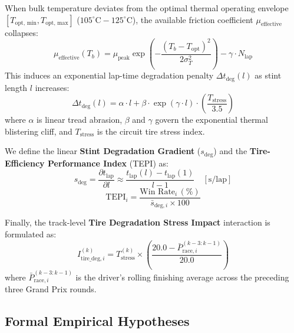 \documentclass[journal]{IEEEtran}
\begin{document}
When bulk temperature deviates from the optimal thermal operating envelope $[T_{\text{opt, min}}, T_{\text{opt, max}}]$ ($105^\circ\text{C} - 125^\circ\text{C}$), the available friction coefficient $\mu_{\text{effective}}$ collapses:
\begin{equation}
\mu_{\text{effective}}(T_b) = \mu_{\text{peak}} \exp\left( -\frac{(T_b - T_{\text{opt}})^2}{2 \sigma_T^2} \right) - \gamma \cdot N_{\text{lap}}
\label{eq:friction_decay}
\end{equation}
This induces an exponential lap-time degradation penalty $\Delta t_{\text{deg}}(l)$ as stint length $l$ increases:
\begin{equation}
\Delta t_{\text{deg}}(l) = \alpha \cdot l + \beta \cdot \exp(\gamma \cdot l) \cdot \left(\frac{T_{\text{stress}}}{3.5}\right)
\label{eq:deg_penalty}
\end{equation}
where $\alpha$ is linear tread abrasion, $\beta$ and $\gamma$ govern the exponential thermal blistering cliff, and $T_{\text{stress}}$ is the circuit tire stress index.

We define the linear \textbf{Stint Degradation Gradient} ($s_{\text{deg}}$) and the \textbf{Tire-Efficiency Performance Index} (TEPI) as:
\begin{equation}
s_{\text{deg}} = \frac{\partial t_{\text{lap}}}{\partial l} \approx \frac{t_{\text{lap}}(l) - t_{\text{lap}}(1)}{l - 1} \quad [\text{s/lap}]
\end{equation}
\begin{equation}
\text{TEPI}_i = \frac{\text{Win Rate}_i \,(\%)}{\bar{s}_{\text{deg}, i} \times 100}
\end{equation}

Finally, the track-level \textbf{Tire Degradation Stress Impact} interaction is formulated as:
\begin{equation}
I_{\text{tire\_deg}, i}^{(k)} = T_{\text{stress}}^{(k)} \times \left( \frac{20.0 - \bar{P}_{\text{race}, i}^{(k-3:k-1)}}{20.0} \right)
\label{eq:tire_deg_impact}
\end{equation}
where $\bar{P}_{\text{race}, i}^{(k-3:k-1)}$ is the driver's rolling finishing average across the preceding three Grand Prix rounds.

\subsection{Formal Empirical Hypotheses}
\end{document}
